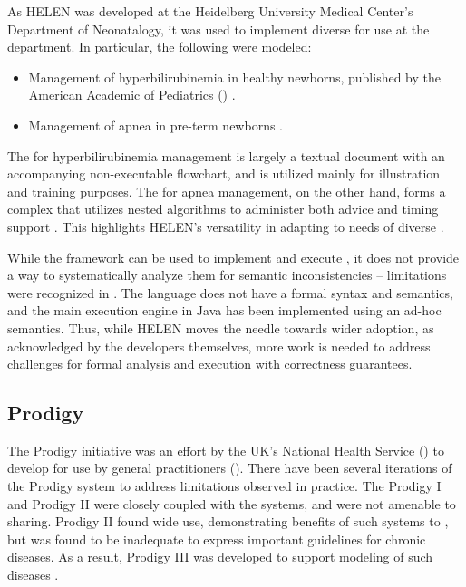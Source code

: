 As HELEN was developed at the Heidelberg University Medical Center's Department
of Neonatalogy, it was used to implement diverse \BPGs{} for use at the
department. In particular, the following \BPGs{} were modeled:
\begin{itemize}
  \item Management of hyperbilirubinemia in healthy newborns, published by the
    American Academic of Pediatrics (\AAP{}) \cite{HyperbilirubinemiaAAP94}.
  \item Management of apnea in pre-term newborns \cite{BhatiaCP00}.
\end{itemize}
The \BPG{} for hyperbilirubinemia management is largely a textual document
with an accompanying non-executable flowchart, and is utilized mainly for
illustration and training purposes. The \BPG{} for apnea management, on the
other hand, forms a complex \CDSSs{} that utilizes nested algorithms to
administer both advice and timing support \cite{SkonetzkiMIM04}. This highlights
HELEN's versatility in adapting to needs of diverse \BPGs{}.

While the framework can be used to implement and execute \BPGs{}, it does not
provide a way to systematically analyze them for semantic inconsistencies --
limitations were recognized in \cite{SkonetzkiMIM04}. The language does not
have a formal syntax and semantics, and the main execution engine in Java
has been implemented using an ad-hoc semantics. Thus, while HELEN moves the
needle towards wider \BPG{} adoption, as acknowledged by the developers themselves,
more work is needed to address challenges for formal analysis and execution with
correctness guarantees.

\subsection{Prodigy}\label{sec:prodigy}

The Prodigy initiative was an effort by the UK's National Health Service
(\NHS{}) to develop \CDSSs{} for use by general practitioners (\GPs{}). There have
been several iterations of the Prodigy system to address limitations
observed in practice. The Prodigy I and Prodigy II were closely coupled with
the \EHR{} systems, and were not amenable to sharing. Prodigy II found wide
use, demonstrating benefits of such systems to \GPs{}, but was found to be
inadequate to express important guidelines for chronic diseases. As a result,
Prodigy III was developed to support modeling of such diseases \cite{JohnsonAMIA00}.

